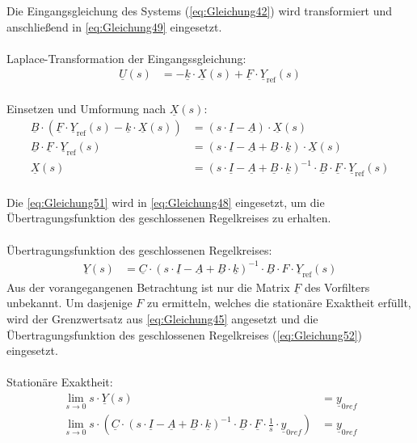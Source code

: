 \documentclass[
	pagesize,
	fontsize=12pt,
	paper=a4,
	oneside,
   reqno
]{scrartcl}
\begin{document}
Die Eingangsgleichung des Systems (\autoref{eq:Gleichung42}) wird transformiert und anschließend in \autoref{eq:Gleichung49} eingesetzt.\\\\
Laplace-Transformation der Eingangssgleichung:
\begin{align*}
    \underline{U}(s) &= -\underline{k}\cdot\underline{X}(s)+\underline{F}\cdot\underline{Y}_{\mathrm{ref}}(s)
\end{align*}\\
Einsetzen und Umformung nach $\underline{X}(s)$:
\begin{align}
    \underline{B}\cdot(\underline{F}\cdot\underline{Y}_{\mathrm{ref}}(s)-\underline{k}\cdot\underline{X}(s)) &= (s\cdot\underline{I}-\underline{A})\cdot\underline{X}(s) \nonumber \\
    \underline{B}\cdot \underline{F}\cdot\underline{Y}_{\mathrm{ref}}(s) &= (s\cdot\underline{I}-\underline{A}+\underline{B}\cdot{\underline{k}})\cdot\underline{X}(s) \nonumber \\
    \underline{X}(s) &= (s\cdot\underline{I}-\underline{A}+\underline{B}\cdot{\underline{k}})^{-1}\cdot\underline{B}\cdot \underline{F}\cdot\underline{Y}_{\mathrm{ref}}(s) \label{eq:Gleichung51}
\end{align}\\
Die \autoref{eq:Gleichung51} wird in \autoref{eq:Gleichung48} eingesetzt, um die Übertragungsfunktion des geschlossenen Regelkreises zu erhalten.\\\\
Übertragungsfunktion des geschlossenen Regelkreises:
\begin{align}
        \underline{Y}(s) &= \underline{C}\cdot(s\cdot\underline{I}-\underline{A}+\underline{B}\cdot{\underline{k}})^{-1}\cdot\underline{B}\cdot F\cdot\underline{Y}_{\mathrm{ref}}(s) \label{eq:Gleichung52}
\end{align}
Aus der vorangegangenen Betrachtung ist nur die Matrix $\underline{F}$ des Vorfilters unbekannt. Um dasjenige $F$ zu ermitteln, welches die stationäre Exaktheit erfüllt, wird der Grenzwertsatz aus \autoref{eq:Gleichung45} angesetzt und die Übertragungsfunktion des geschlossenen Regelkreises (\autoref{eq:Gleichung52}) eingesetzt.\\\\
Stationäre Exaktheit:
\begin{align}
    \lim_{s \to 0} s\cdot \underline{Y}(s) &= \underline{y}_{0ref} \nonumber \\
    \lim_{s \to 0} s\cdot (\underline{C}\cdot(s\cdot\underline{I}-\underline{A}+\underline{B}\cdot{\underline{k}})^{-1}\cdot\underline{B}\cdot\underline{F}\cdot\frac{1}{s}\cdot\underline{y}_{0ref}) &= \underline{y}_{0ref} \label{eq:Gleichung53}
\end{align}\\
\end{document}
